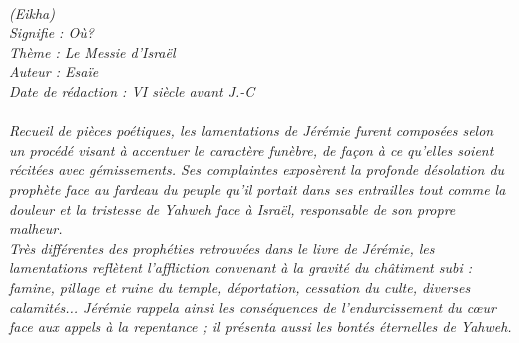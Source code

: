 \BFont
\noindent\hrulefill
\textit{
\bigskip
{\centering{}
\\(Eikha)
\\Signifie : Où?
\\Thème : Le Messie d'Israël
\\Auteur : Esaïe
\\Date de rédaction : VI siècle avant J.-C\\}
}
\textit{
\\Recueil de pièces poétiques,  les lamentations de Jérémie furent composées selon un procédé visant à accentuer le caractère funèbre, de façon à ce qu’elles soient récitées avec gémissements. Ses complaintes exposèrent la profonde désolation du prophète face au fardeau du peuple qu’il portait dans ses entrailles tout comme la douleur et la tristesse de Yahweh face à Israël, responsable de son propre malheur.
\bigskip
\\Très différentes des prophéties retrouvées dans le livre de Jérémie, les lamentations reflètent l’affliction convenant à la gravité du châtiment subi : famine, pillage et ruine du temple, déportation, cessation du culte, diverses calamités... Jérémie rappela ainsi les conséquences de l’endurcissement du cœur face aux appels à la repentance ; il présenta aussi les bontés éternelles de Yahweh. 
\bigskip
}
\par\nobreak\noindent\hrulefill
